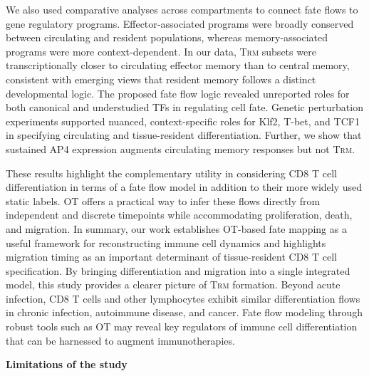 We also used comparative analyses across compartments to connect fate
flows to gene regulatory programs. Effector-associated programs were
broadly conserved between circulating and resident populations, whereas
memory-associated programs were more context-dependent. In our data,
T\textsc{rm} subsets were transcriptionally closer to circulating
effector memory than to central memory, consistent with emerging views
that resident memory follows a distinct developmental logic. The
proposed fate flow logic revealed unreported roles for both canonical
and understudied TFs in regulating cell fate. Genetic perturbation
experiments supported nuanced, context-specific roles for Klf2, T-bet,
and TCF1 in specifying circulating and tissue-resident differentiation.
Further, we show that sustained AP4 expression augments circulating
memory responses but not T\textsc{rm}.

These results highlight the complementary utility in considering CD8 T
cell differentiation in terms of a fate flow model in addition to their
more widely used static labels. OT offers a practical way to infer these
flows directly from independent and discrete timepoints while
accommodating proliferation, death, and migration. In summary, our work
establishes OT-based fate mapping as a useful framework for
reconstructing immune cell dynamics and highlights migration timing as
an important determinant of tissue-resident CD8 T cell specification. By
bringing differentiation and migration into a single integrated model,
this study provides a clearer picture of T\textsc{rm} formation. Beyond
acute infection, CD8 T cells and other lymphocytes exhibit similar
differentiation flows in chronic infection, autoimmune disease, and
cancer. Fate flow modeling through robust tools such as OT may reveal
key regulators of immune cell differentiation that can be harnessed to
augment immunotherapies.

\textbf{Limitations of the study}

